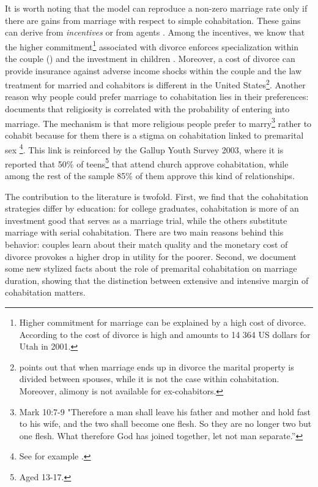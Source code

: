 \documentclass[12pt]{article}
\begin{document}
It is worth noting that the model can reproduce a non-zero marriage rate only if there are gains from marriage with respect to simple cohabitation. These gains can derive from \textit{incentives} or from agents \citet{preferences}. Among the incentives, we know that  the higher commitment\footnote{Higher commitment for marriage can be explained by a high cost of divorce. According to \citet{schramm2006} the cost of divorce is high and amounts to 14 364 US dollars for Utah in 2001.} associated with divorce enforces specialization within the couple (\cite{cigno2012}) and the investment in children \citet{lundberg2016}. Moreover, a cost of divorce can provide insurance against adverse income shocks within the couple and the law treatment for married and cohabitors is different in the United States\footnote{\citet{bowman2010} points out that when marriage ends up in divorce the marital property is divided between spouses, while it is not the case within cohabitation. Moreover, alimony is not available for ex-cohabitors.}. Another reason why people could prefer marriage to cohabitation lies in their preferences: \citet{thornton2008} documents that religiosity is correlated with the probability of entering into marriage. The mechanism is that more religious people prefer to marry\footnote{Mark 10:7-9 "Therefore a man shall leave his father and mother and hold fast to his wife,  and the two shall become one flesh. So they are no longer two but one flesh. What therefore God has joined together, let not man separate.”} rather to cohabit because for them there is a stigma on cohabitation linked to premarital sex \footnote{See for example \citet{fernandez2014}.}. This link is reinforced by the Gallup Youth Survey 2003, where it is reported that 50\% of teens\footnote{Aged 13-17.} that attend church approve cohabitation, while among the rest of the sample 85\% of them approve this kind of relationships.

 The contribution to the literature is twofold. First, we find that the cohabitation strategies differ by education: for college graduates, cohabitation is more of an investment good that serves as a marriage trial, while the others substitute marriage with serial cohabitation. There are two main reasons behind this behavior: couples learn about their match quality and the monetary cost of divorce provokes a higher drop in utility for the poorer. Second, we document some new stylized facts about the role of premarital cohabitation on marriage duration, showing that the distinction between extensive and intensive margin of cohabitation matters. 
\end{document}
